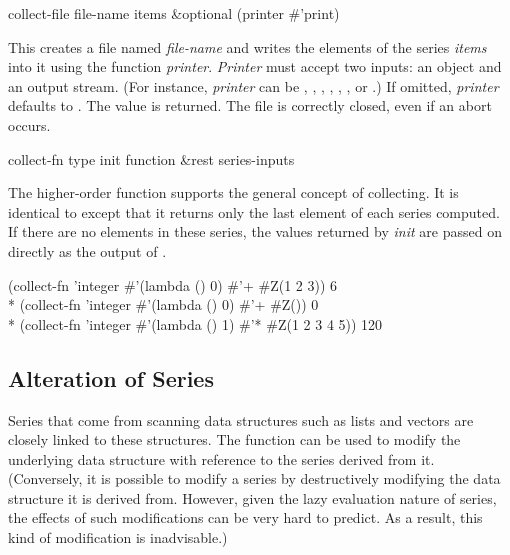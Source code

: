 \begin{defun}[Function]
collect-file file-name items &optional (printer \#'print)

This creates a file named \emph{file-name} and writes the
elements of the series \emph{items} into it using the function {\it
printer}.  \emph{Printer} must accept two inputs: an object
and an output stream.  (For instance, \emph{printer} can be ,
, , , ,
, or .)
If omitted, \emph{printer} defaults to .  The value  is
returned.  The file is correctly closed, even if an abort occurs.
\end{defun}


\begin{defun}[Function]
collect-fn type init function &rest series-inputs

The higher-order function  supports the general concept of
collecting.  It is identical to  except that it
returns only the last element of each series computed.  If there are no elements
in these series, the values returned by \emph{init} are passed on directly
as the output of .
\begin{lisp}
(collect-fn 'integer \#'(lambda () 0) \#'+ \#Z(1 2 3)) {\EV} 6 \\*
(collect-fn 'integer \#'(lambda () 0) \#'+ \#Z()) {\EV} 0 \\*
(collect-fn 'integer \#'(lambda () 1) \#'* \#Z(1 2 3 4 5)) {\EV} 120
\end{lisp}
\end{defun}

\subsection{Alteration of Series}

Series that come from scanning data structures such as lists and vectors
are closely linked to these structures.  The function 
 can be used to modify the underlying data structure with
reference to the series derived from it. (Conversely, it is possible to
modify a series by destructively modifying the data structure it is derived
from.  However, given the lazy evaluation nature of series, the effects of
such modifications can be very hard to predict.  As a result, this kind of
modification is inadvisable.)

